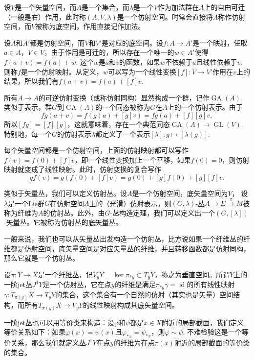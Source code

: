 \begin{para}[仿射空间]
	设$V$是一个矢量空间，而$A$是一个集合，而$\lambda$是一个$V$作为加法群在$A$上的自由可迁（一般是右）作用，此时称$(A,V,\lambda)$是一个仿射空间。时常会直接将$A$称作仿射空间，而$V$被称为底空间，作用直接记作加法。

	设$A$和$A'$都是仿射空间，而$V$和$V'$是对应的底空间。设$f:A\to A'$是一个映射，任取$a\in A$，$V\in V$，由于作用是可迁的，所以存在一个唯一的$w\in A'$使得$f(a+v)=f(a)+w$. 这个$w$是$a$和$v$的函数，如果$w$不依赖于$a$且线性依赖于$v$. 则称$f$是一个仿射映射。从定义，$w$可以写为一个线性变换$[f]:V\to V'$作用在$v$上的结果，所以我们有$f(a+v)=f(a)+[f]v$.

	所有$A\to A$的可逆仿射变换（或称仿射同构）显然构成一个群，记作$\operatorname{GA}(A)$. 类似于表示，群$G$到$\operatorname{GA}(A)$的一个同态被称为$G$在$A$上的一个仿射表示。由于
	\[
		fg(a+v)=f(g(a)+[g]v)=fg(a)+[f][g]v,
	\]
	所以$[fg]=[f][g]$，这就意味着，存在一个典范同态$\operatorname{GA}(A)\to \operatorname{GL}(V)$. 特别地，每一个$G$的仿射表示$\lambda$都定义了一个表示$[\lambda]:g\mapsto [\lambda(g)]$.
\end{para}

每个矢量空间都是一个仿射空间，上面的仿射映射都可以写作$f(v)=f(0)+[f]v$，即一个线性变换加上一个平移，如果$f(0)=0$，则仿射映射就变成了线性映射。此时，仿射变换的复合写作
\[
	gf(v)=g(f(0)+[f]v)=g(0)+[g]f(0)+[g][f]v.
\]

\begin{para}[仿射丛]
	类似于矢量丛，我们可以定义仿射丛。设$A$是一个仿射空间，底矢量空间为$V$，	设$\lambda$是一个Lie群$G$在仿射空间$A$上的（光滑）仿射表示，则$(G,\lambda)$-丛$A\to E\xrightarrow{\pi} M$被称为纤维为$A$的仿射丛。此外，由$G$-丛构造定理，我们可以定义出一个$(G,[\lambda])$-矢量丛。它被称为仿射丛的底矢量丛。
\end{para}

一般来说，我们也可以从矢量丛出发构造一个仿射丛，比方说如果一个纤维丛的纤维都是仿射空间，底矢量空间是对应矢量丛的纤维，并且转移函数都是仿射同构，那么它就是一个仿射丛。

\begin{para}[一阶jet丛]
	设$\pi:Y\to X$是一个纤维丛，记$V_yY=\ker\pi_{*y}\subset T_yY$，称之为垂直空间。所谓$Y$上的一阶jet丛$J^1Y$是一个仿射丛，它在点$y$的纤维是满足$\pi_{*y}\gamma=\operatorname{id}$的所有线性映射$\gamma:T_{\pi(y)}X\to T_yY$的集合，这个集合有一个自然的仿射（其实也是矢量）空间结构，而所有$T_{\pi(y)}X\to V_yY$的线性映射构成其底矢量空间。

	一阶jet丛也可以用等价类来构造：设$\varphi$和$\psi$都是$x\in X$附近的局部截面，我们定义等价关系如下：如果$\varphi(x)=\psi(x)$且$\varphi_{*x}=\psi_{*x}$，则$\varphi\sim \psi$. 不难检验这是一个等价关系，那么我们就定义丛$J^1Y$在点$y$的纤维为在点$\pi(x)$附近的局部截面的等价类的集合。
\end{para}

